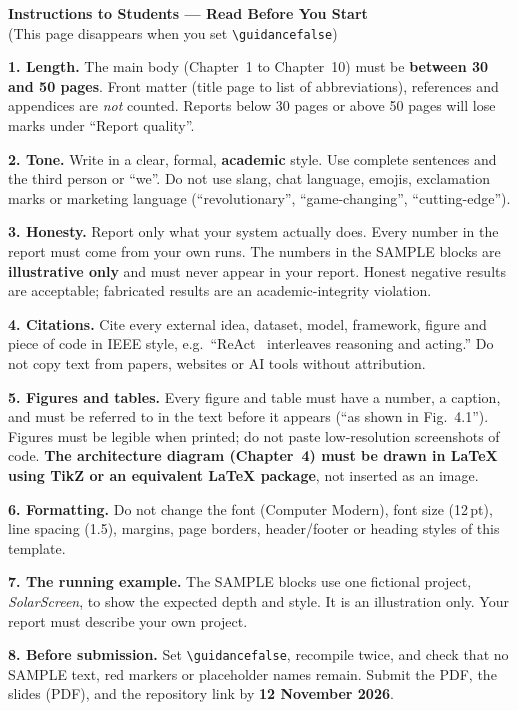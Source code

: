 \documentclass[12pt,a4paper,oneside]{report}
\newcommand{\SubmissionDate}{12 November 2026}
\newif\ifguidance
\begin{document}
\ifguidance
{}
\thispagestyle{empty}
\begin{center}
{\Large\bfseries\textcolor{bmsblue}{Instructions to Students --- Read Before You Start}}\\[4pt]
{\small (This page disappears when you set \texttt{\textbackslash guidancefalse})}
\end{center}

\begin{tcolorbox}[colback=guidebg,colframe=bmsblue,arc=2pt,boxrule=0.6pt]
\small{}
\textbf{1. Length.} The main body (Chapter~1 to Chapter~10) must be \textbf{between 30 and 50 pages}.
Front matter (title page to list of abbreviations), references and appendices are \emph{not} counted.
Reports below 30 pages or above 50 pages will lose marks under ``Report quality''.

\medskip
\textbf{2. Tone.} Write in a clear, formal, \textbf{academic} style. Use complete sentences and
the third person or ``we''. Do not use slang, chat language, emojis, exclamation marks or
marketing language (``revolutionary'', ``game-changing'', ``cutting-edge'').

\medskip
\textbf{3. Honesty.} Report only what your system actually does. Every number in the report
must come from your own runs. The numbers in the SAMPLE blocks are \textbf{illustrative only}
and must never appear in your report. Honest negative results are acceptable; fabricated results
are an academic-integrity violation.

\medskip
\textbf{4. Citations.} Cite every external idea, dataset, model, framework, figure and piece of code
in IEEE style, e.g.\ ``ReAct~\cite{yao2023react} interleaves reasoning and acting.''
Do not copy text from papers, websites or AI tools without attribution.

\medskip
\textbf{5. Figures and tables.} Every figure and table must have a number, a caption, and
must be referred to in the text before it appears (``as shown in Fig.~4.1''). Figures must be
legible when printed; do not paste low-resolution screenshots of code. \textbf{The architecture
diagram (Chapter~4) must be drawn in LaTeX using TikZ or an equivalent LaTeX package}, not inserted
as an image.

\medskip
\textbf{6. Formatting.} Do not change the font (Computer Modern), font size (12\,pt), line
spacing (1.5), margins, page borders, header/footer or heading styles of this template.

\medskip
\textbf{7. The running example.} The SAMPLE blocks use one fictional project,
\emph{SolarScreen}, to show the expected depth and style. It is an illustration only.
Your report must describe your own project.

\medskip
\textbf{8. Before submission.} Set \texttt{\textbackslash guidancefalse}, recompile twice,
and check that no SAMPLE text, red markers or placeholder names remain. Submit the PDF,
the slides (PDF), and the repository link by \textbf{\SubmissionDate}.
\end{tcolorbox}
\end{document}
